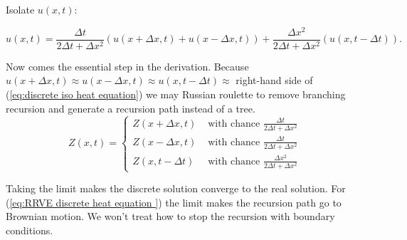 \documentclass[a4paper,12pt]{article}
\begin{document}
Isolate $u(x,t)$:

\begin{equation} \label{eq:discrete iso heat equation}
    u(x,t) =
    \frac{\Delta t}{ 2 \Delta t + \Delta x^{2}}
    \left(
    u(x+\Delta x,t)+u(x-\Delta x,t)
    \right) +
    \frac{\Delta x^{2}}{ 2 \Delta t + \Delta x^{2}}
    \left(
    u(x,t-\Delta t)
    \right).
\end{equation}

Now comes the essential step in the derivation.
Because $u(x+\Delta x,t) \approx u(x-\Delta x,t) \approx u(x,t-\Delta t) \approx$
right-hand side of (\ref{eq:discrete iso heat equation}) we may Russian roulette
to remove branching recursion and generate a recursion path instead of a tree.
\begin{equation} \label{eq:RRVE discrete heat equation }
    Z(x,t) =
    \begin{cases}
        Z(x+\Delta x , t)  & \text{ with chance  } \frac{\Delta t}{ 2 \Delta t + \Delta x^{2}}     \\
        Z(x-\Delta x , t)  & \text{ with chance  } \frac{\Delta t}{ 2 \Delta t + \Delta x^{2}}     \\
        Z(x, t - \Delta t) & \text{ with chance  } \frac{\Delta x^{2}}{ 2 \Delta t + \Delta x^{2}}
    \end{cases}
\end{equation}

Taking the limit
makes the discrete solution converge to the real solution.
For (\ref{eq:RRVE discrete heat equation }) the limit
makes the recursion path go to Brownian motion. We won't treat
how to stop the recursion with boundary conditions.


\newpage
\begin{abstract}
    
\end{abstract}

\printbibliography
\newpage
\end{document}
